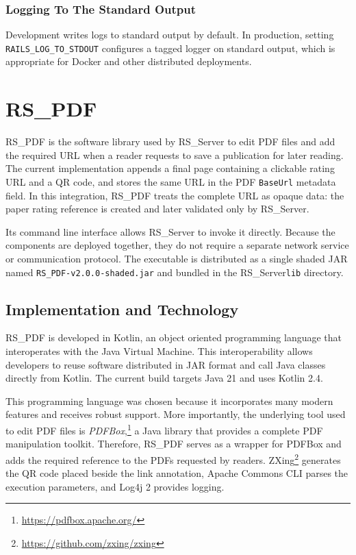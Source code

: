 \documentclass[a4paper, english]{article}
\newcommand{\rsserver}{RS\_Server\xspace}
\newcommand{\rspdf}{RS\_PDF\xspace}
\begin{document}
\subsubsection{Logging To The Standard Output}

Development writes logs to standard output by default. In production, setting \verb|RAILS_LOG_TO_STDOUT| configures a tagged logger on standard output, which is appropriate for Docker and other distributed deployments.

\section{\rspdf}

\label{rs-pdf}

\rspdf \cite{RS-PDF} is the software library used by \rsserver to edit PDF files and add the required URL when a reader requests to save a publication for later reading. The current implementation appends a final page containing a clickable rating URL and a QR code, and stores the same URL in the PDF \verb|BaseUrl| metadata field. In this integration, \rspdf treats the complete URL as opaque data: the paper rating reference is created and later validated only by \rsserver.

Its command line interface allows \rsserver to invoke it directly. Because the components are deployed together, they do not require a separate network service or communication protocol. The executable is distributed as a single shaded JAR named \verb|RS_PDF-v2.0.0-shaded.jar| and bundled in the \rsserver \verb|lib| directory.

\subsection{Implementation and Technology}

\rspdf is developed in Kotlin, an object oriented programming language that interoperates with the Java Virtual Machine. This interoperability allows developers to reuse software distributed in JAR format and call Java classes directly from Kotlin. The current build targets Java 21 and uses Kotlin 2.4.

This programming language was chosen because it incorporates many modern features and receives robust support. More importantly, the underlying tool used to edit PDF files is \emph{PDFBox},\footnote{\url{https://pdfbox.apache.org/}} a Java library that provides a complete PDF manipulation toolkit. Therefore, \rspdf serves as a wrapper for PDFBox and adds the required reference to the PDFs requested by readers. ZXing\footnote{\url{https://github.com/zxing/zxing}} generates the QR code placed beside the link annotation, Apache Commons CLI parses the execution parameters, and Log4j 2 provides logging.
\end{document}

